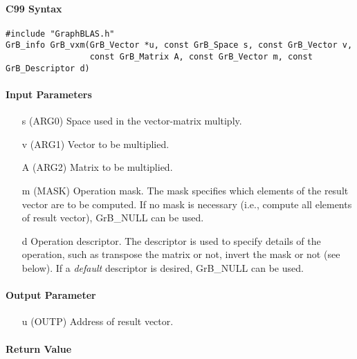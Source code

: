 \documentclass[11pt]{extarticle}
\begin{document}
\paragraph{C99 Syntax}

\begin{verbatim}
#include "GraphBLAS.h"
GrB_info GrB_vxm(GrB_Vector *u, const GrB_Space s, const GrB_Vector v, 
                 const GrB_Matrix A, const GrB_Vector m, const GrB_Descriptor d)
\end{verbatim}


\paragraph{Input Parameters}

\begin{itemize}
	\item[{\sf s}] ({\sf ARG0}) Space used in the vector-matrix multiply.
	\item[{\sf v}] ({\sf ARG1}) Vector to be multiplied.
	\item[{\sf A}] ({\sf ARG2}) Matrix to be multiplied.
	\item[{\sf m}] ({\sf MASK}) Operation mask. The mask specifies which elements of the result vector are to be computed.
		       If no mask is necessary (i.e., compute all elements of result vector), {\sf GrB\_NULL} can be used.
	\item[{\sf d}] Operation descriptor. The descriptor is used to specify details of the operation, such as transpose the matrix or not,
		       invert the mask or not (see below). If a \emph{default} descriptor is desired, {\sf GrB\_NULL} can be used.
\end{itemize}


\paragraph{Output Parameter}

\begin{itemize}
	\item[{\sf u}] ({\sf OUTP}) Address of result vector.
\end{itemize}

\paragraph{Return Value}
\end{document}
